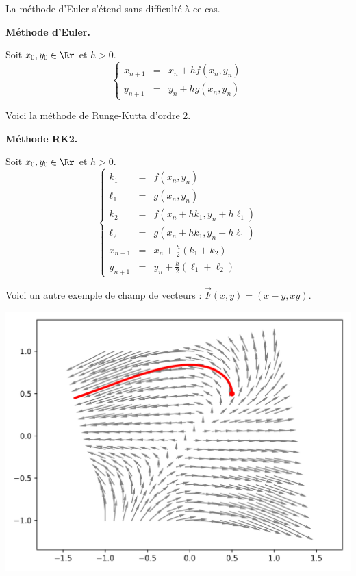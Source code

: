 \documentclass[11pt,class=report,crop=false]{standalone}
\begin{document}
\bigskip

La méthode d'Euler s'étend sans difficulté à ce cas.

\textbf{Méthode d'Euler.}

Soit $x_0,y_0 \in \Rr$ et $h>0$.
$$\left\lbrace
\begin{array}{rcl}
  x_{n+1} &=& x_n + h f(x_n,y_n) \\
  y_{n+1} &=& y_n + h g(x_n,y_n)  
\end{array}
\right.$$

\bigskip

Voici la méthode de Runge-Kutta d'ordre 2.

\textbf{Méthode RK2.}

Soit $x_0,y_0 \in \Rr$ et $h>0$.
$$\left\lbrace
\begin{array}{rcl}
  k_1 &=& f(x_n,y_n) \\
  \ell_1 &=& g(x_n,y_n) \\
  k_2 &=& f(x_n + h k_1, y_n + h \ell_1) \\
  \ell_2 &=& g(x_n + h k_1, y_n + h \ell_1) \\
  x_{n+1} &=& x_n + \frac{h}{2} (k_1 + k_2) \\
  y_{n+1} &=& y_n + \frac{h}{2} (\ell_1 + \ell_2)
\end{array}
\right.$$

\bigskip

Voici un autre exemple de champ de vecteurs : $\vec F (x,y) = (x-y, xy)$.
\begin{center}
  \includegraphics[scale=\myscale, scale=0.8]{figures/equadiff-sys-04}
\end{center}
\end{document}
